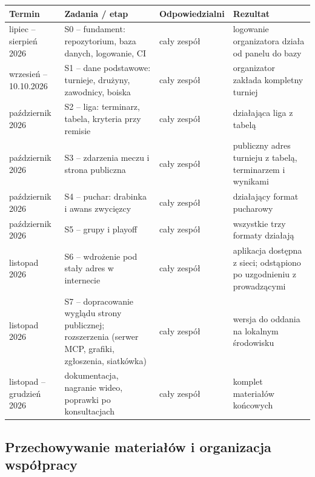 \documentclass[11pt,a4paper,oneside]{article}
\newif\ifpodpowiedzi
\newcommand{\podpowiedz}[1]{\ifpodpowiedzi\par\begingroup\small\color{hintcolor}\textit{Wskazówka: #1}\par\endgroup\fi}
\begin{document}
\begin{tabularx}{\textwidth}{@{}p{} Y p{0.21\textwidth} Y@{}}
\toprule
Termin & Zadania / etap & Odpowiedzialni & Rezultat\\
\midrule
lipiec -- sierpień 2026 & S0 -- fundament: repozytorium, baza danych, logowanie, CI & cały zespół & logowanie organizatora działa od panelu do bazy\\
wrzesień -- 10.10.2026 & S1 -- dane podstawowe: turnieje, drużyny, zawodnicy, boiska & cały zespół & organizator zakłada kompletny turniej\\
październik 2026 & S2 -- liga: terminarz, tabela, kryteria przy remisie & cały zespół & działająca liga z tabelą\\
październik 2026 & S3 -- zdarzenia meczu i strona publiczna & cały zespół & publiczny adres turnieju z tabelą, terminarzem i wynikami\\
październik 2026 & S4 -- puchar: drabinka i awans zwycięzcy & cały zespół & działający format pucharowy\\
październik 2026 & S5 -- grupy i playoff & cały zespół & wszystkie trzy formaty działają\\
listopad 2026 & S6 -- wdrożenie pod stały adres w internecie & cały zespół & aplikacja dostępna z sieci; odstąpiono po uzgodnieniu z prowadzącymi\\
listopad 2026 & S7 -- dopracowanie wyglądu strony publicznej; rozszerzenia (serwer MCP, grafiki, zgłoszenia, siatkówka) & cały zespół & wersja do oddania na lokalnym środowisku\\
listopad -- grudzień 2026 & dokumentacja, nagranie wideo, poprawki po konsultacjach & cały zespół & komplet materiałów końcowych\\
\bottomrule
\end{tabularx}
\podpowiedz{Od trzeciego spotkania przygotowujcie wspólny raport za okres między poprzednim a bieżącym spotkaniem, z podziałem wykonanych prac na członków zespołu.}

\newpage
\subsection{Przechowywanie materiałów i organizacja współpracy}

\podpowiedz{W projekcie programistycznym podaj adres repozytorium kodu. W projekcie o innym charakterze, np. animacji 3D, wskaż uzgodnione z prowadzącymi miejsce przechowywania plików źródłowych, zasobów i rezultatów. Opisz sposób oznaczania kolejnych wersji i zapewnij dostęp obojgu prowadzącym.}
\end{document}
